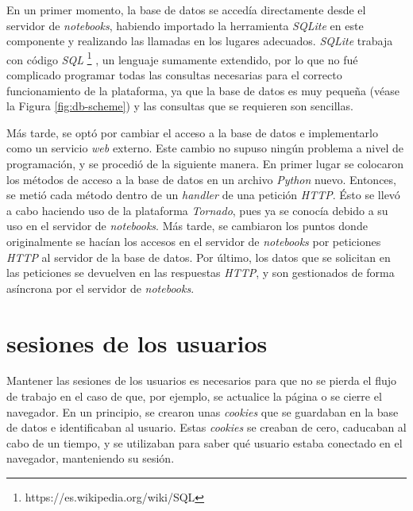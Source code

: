 \documentclass[11pt,spanish,listoffigures]{tfgetsinf}
\begin{document}
En un primer momento, la base de datos se accedía directamente desde el servidor de \textit{notebooks}, habiendo importado la herramienta \textit{SQLite} en este componente y realizando las llamadas en los lugares adecuados. \textit{SQLite} trabaja con código \textit{SQL} \footnote{https://es.wikipedia.org/wiki/SQL} , un lenguaje sumamente extendido,  por lo que no fué complicado programar todas las consultas necesarias para el correcto funcionamiento de la plataforma, ya que la base de datos es muy pequeña (véase la Figura \ref{fig:db-scheme}) y las consultas que se requieren son sencillas.

Más tarde, se optó por cambiar el acceso a la base de datos e implementarlo como un servicio \textit{web} externo. Este cambio no supuso ningún problema a nivel de programación, y se procedió de la siguiente manera. En primer lugar se colocaron los métodos de acceso a la base de datos en un archivo \textit{Python} nuevo. Entonces, se metió cada método dentro de un \textit{handler} de una petición \textit{HTTP}. Ésto se llevó a cabo haciendo uso de la plataforma \textit{Tornado}, pues ya se conocía debido a su uso en el servidor de \textit{notebooks}. Más tarde, se cambiaron los puntos donde originalmente se hacían los accesos en el servidor de \textit{notebooks} por peticiones \textit{HTTP} al servidor de la base de datos. Por último, los datos que se solicitan en las peticiones se devuelven en las respuestas \textit{HTTP}, y son gestionados de forma asíncrona por el servidor de \textit{notebooks}.



\section{sesiones de los usuarios}
\label{sec:desarrollo-sesiones}

Mantener las sesiones de los usuarios es necesarios para que no se pierda el flujo de trabajo en el caso de que, por ejemplo, se actualice la página o se cierre el navegador. En un principio, se crearon unas \textit{cookies} que se guardaban en la base de datos e identificaban al usuario. Estas \textit{cookies} se creaban de cero,  caducaban al cabo de un tiempo, y se utilizaban para saber qué usuario estaba conectado en el navegador, manteniendo su sesión. 
\end{document}
